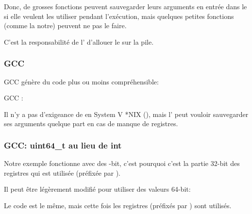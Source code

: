 Donc, de grosses fonctions peuvent sauvegarder leurs arguments en entrée dans le 
si elle veulent les utiliser pendant l'exécution, mais quelques petites fonctions
(comme la notre) peuvent ne pas le faire.

C'est la responsabilité de l' d'allouer le 
sur la pile.

\subsubsection{GCC}

GCC \Optimizing génère du code plus ou moins compréhensible:



GCC \NonOptimizing:




Il n'y a pas d'exigeance de  en System V *NIX (\SysVABI), mais
l' peut vouloir sauvegarder ses arguments quelque part
en cas de manque de registres.

\subsubsection{GCC: uint64\_t au lieu de int}


Notre exemple fonctionne avec des -bit, c'est pourquoi c'est la partie 32-bit
des registres qui est utilisée (préfixée par ).

Il peut être légèrement modifié pour utiliser des valeurs 64-bit:





Le code est le même, mais cette fois les registres  (préfixés par ) sont utilisés.

